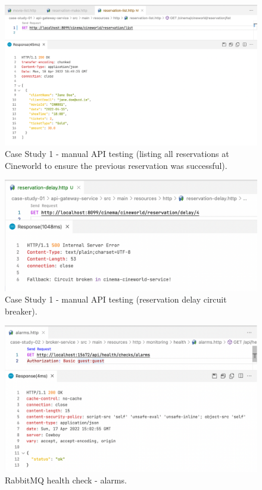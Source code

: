 \begin{figure}[H]
  \centering
  \includegraphics[width=1.0\linewidth]{./assets/images/case-study-01/cs01-manual-3.png}
  \caption{Case Study 1 - manual API testing (listing all reservations at Cineworld to ensure the previous reservation was successful).}
  \label{fig:cs01-manual-3}
\end{figure}

\begin{figure}[H]
  \centering
  \includegraphics[width=1.0\linewidth]{./assets/images/case-study-01/cs01-manual-4.png}
  \caption{Case Study 1 - manual API testing (reservation delay circuit breaker).}
  \label{fig:cs01-manual-4}
\end{figure}


\begin{figure}[H]
  \centering
  \includegraphics[width=1.0\linewidth]{./assets/images/case-study-02/cs02-hc1.png}
  \caption{RabbitMQ health check - alarms.}
  \label{fig:cs02-hc1}
\end{figure}

